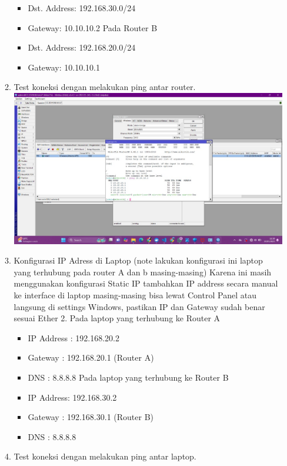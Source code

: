 \begin{enumerate}
\begin{enumerate}
\begin{itemize}
            \item Dst. Address: 192.168.30.0/24
            \item Gateway: 10.10.10.2 Pada Router B
            \item Dst. Address: 192.168.20.0/24
            \item Gateway: 10.10.10.1
        \end{itemize}
        \item Test koneksi dengan melakukan ping antar router. \newline 
        \includegraphics[scale=0.4]{P1/img/5.jpg} \newline
        \item Konfigurasi IP Adress di Laptop (note lakukan konfigurasi ini laptop yang terhubung pada router A dan b masing-masing) Karena ini masih menggunakan konfigurasi Static IP tambahkan IP address secara manual ke interface di laptop masing-masing bisa lewat Control Panel atau langsung di settings Windows, pastikan IP dan Gateway sudah benar sesuai Ether 2. Pada laptop yang terhubung ke Router A
        \begin{itemize}
            \item IP Address : 192.168.20.2
            \item Gateway : 192.168.20.1 (Router A)
            \item DNS : 8.8.8.8 \newline Pada laptop yang terhubung ke Router B
            \item IP Address: 192.168.30.2
            \item Gateway : 192.168.30.1 (Router B)
            \item DNS : 8.8.8.8
        \end{itemize}
        \item Test koneksi dengan melakukan ping antar laptop.

\end{enumerate}
\end{enumerate}
